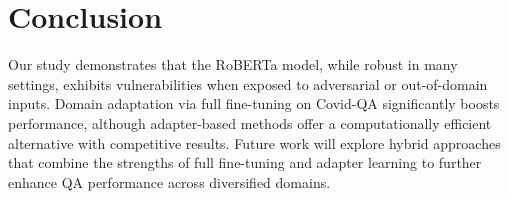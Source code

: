 \documentclass[11pt]{article}
\begin{document}
\section{Conclusion}
Our study demonstrates that the RoBERTa model, while robust in many settings, exhibits vulnerabilities when exposed to adversarial or out-of-domain inputs. Domain adaptation via full fine-tuning on Covid-QA significantly boosts performance, although adapter-based methods offer a computationally efficient alternative with competitive results. Future work will explore hybrid approaches that combine the strengths of full fine-tuning and adapter learning to further enhance QA performance across diversified domains.



\end{document}
